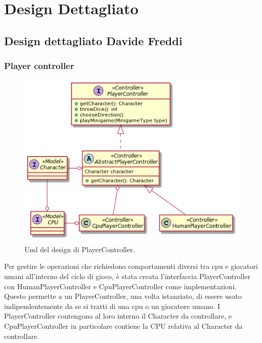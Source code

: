 \documentclass[a4paper,12pt]{report}
\begin{document}
	\section{Design Dettagliato}
	\subsection{Design dettagliato Davide Freddi}
	\subsubsection{Player controller}
    \begin{figure}[h]
    \centering{}
    \includegraphics[width=\textwidth]{images/freddi/PlayerControllerImg.png}
    \caption{Uml del design di PlayerController.}
    \label{img:goodarch}
    \end{figure}

    Per gestire le operazioni che richiedono comportamenti diversi tra cpu e giocatori umani all'interno del ciclo di gioco, è stata creata l'interfaccia PlayerController con HumanPlayerController e CpuPlayerController come implementazioni.
    Questo permette a un PlayerController, una volta istanziato, di essere usato indipendentemente da se si tratti di una cpu o un giocatore umano.
    I PlayerController contengono al loro interno il Character da controllare, e CpuPlayerController in particolare contiene la CPU relativa al Character da controllare.
\end{document}
